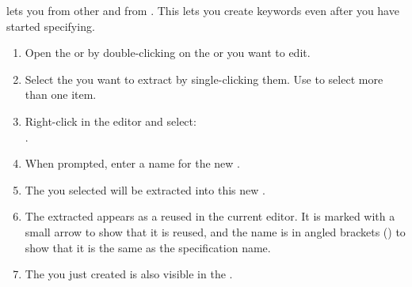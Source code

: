 
\app{} lets you  \gdcases{} from other \gdcases{} and from \gdsuites{}. This lets you create keywords even after you have started specifying. 

\begin{enumerate}
\item Open the \gdtestcaseeditor{} or \gdtestsuiteeditor{} by double-clicking on the \gdcase{} or \gdsuite{} you  want to edit. 
\item Select the \gdcases{} you want to extract by single-clicking them. Use 
   to select more than one item. 
\item Right-click in the editor and  select: \\
.
\item When prompted, enter a name for the new \gdcase{}. 
\item The \gdcases{} you selected will be extracted into this new \gdcase{}. 
\item The extracted \gdcase{} appears as a reused \gdcase{} in the current editor. It is marked with a small arrow to show that it is reused, and the \gdcase{} name is in angled brackets (\bxshell{< >}) to show that it is the same as the specification name. 
\item The \gdcase{} you just created is also visible in the \gdtestcasebrowser{}. 
\end{enumerate}
